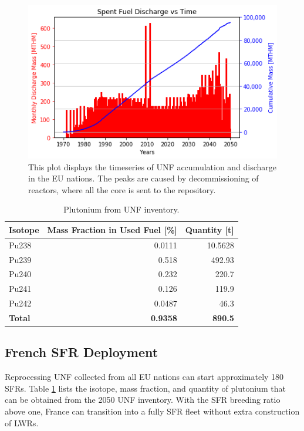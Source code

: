 \begin{figure}[htbp!]
	\begin{center}
			\includegraphics[scale=0.7]{./images/eu_future/snf_discharge.png}
	\end{center}
	\caption{This plot displays the timeseries of \gls{UNF} accumulation and discharge in the \gls{EU} nations.
			 The peaks are caused by decommissioning of reactors, where all the core is sent to the repository.}
	\label{fig:eu_snf}
\end{figure}
\FloatBarrier


\begin{table}[h]
	\centering
	\caption{Plutonium from \gls{UNF} inventory.}
	\begin{tabular}{lrr}
		\hline
		\textbf{Isotope} & \textbf{Mass Fraction in Used Fuel [\%]} & \textbf{Quantity [t]} \\ \hline
		Pu238 & 0.0111 & 10.5628 \\ 
		Pu239 & 0.518 & 492.93 \\ 
		Pu240 & 0.232 & 220.7 \\ 
		Pu241 & 0.126 & 119.9 \\ 
		Pu242 & 0.0487 & 46.3 \\ \hline
		\textbf{Total} & \textbf{0.9358} & \textbf{890.5} \\ \hline
	\end{tabular}
	
	\label{tab:pu}
\end{table}



\subsection{French \gls{SFR} Deployment}

Reprocessing \gls{UNF} collected from all EU nations can start approximately
180 \glspl{SFR}. Table \ref{tab:pu} lists the isotope, mass fraction,
and quantity of plutonium that can be obtained from the 2050 \gls{UNF} inventory.
 With the \gls{SFR} breeding ratio above one, France can transition into
a fully \gls{SFR} fleet without extra construction of \glspl{LWR}. 


